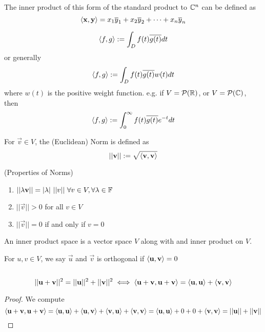 \begin{remark}[Generalization to $\b C^n$]
    The inner product of this form of the standard product to $\b C^n$ can be defined as
    \[ \langle \mathbf x, \mathbf y \rangle = x_1\overline y_1 + x_2\overline y_2 + \cdots + x_n\overline y_n\]
\end{remark}
\begin{remark}
    \[ \langle f, g \rangle : = \int_D f(t)\overline{g(t)} dt\]
    or generally \[ \langle f, g \rangle : = \int_D f(t)\overline{g(t)}w(t) dt\]
    where $w(t)$ is the positive weight function. e.g. if $V = \mathcal P(\mathbb R)$, or $V = \mathcal P(\mathbb C)$, then 
    \[ \langle f, g \rangle : = \int_0^\infty f(t)\overline{g(t)}e^{-t} dt\]
\end{remark}
\begin{definition}
    For $\vec v \in V$, the (Euclidean) Norm is defined as
    \[ ||\mathbf v|| : = \sqrt{\langle \mathbf v,\mathbf v \rangle}\] 
\end{definition}
\begin{theorem}(Properties of Norms)
    \begin{enumerate}
        \item $||\lambda \vec v || = |\lambda| \ ||v|| \ \forall v \in V, \forall \lambda \in \b F $
        \item $||\vec v|| > 0$ for all $v \in V$
        \item $||\vec v|| = 0$ if and only if $v = 0$ 
    \end{enumerate}
\end{theorem}
\begin{definition}
    An inner product space is a vector space $V$ along with and inner product on $V$.
\end{definition}
\begin{definition}
    For $u,v \in V$, we say $\vec u$ and $\vec v$ is orthogonal if $\langle \mathbf u, \mathbf v\rangle = 0$
\end{definition}
\begin{theorem} $ $
\begin{center}
\end{center}
\[ ||\mathbf u + \mathbf v||^2 = ||\mathbf u||^2 + ||\mathbf v||^2 \iff \langle \mathbf u + \mathbf v, \mathbf u + \mathbf v\rangle = \langle \mathbf u, \mathbf u \rangle + \langle \mathbf v, \mathbf v \rangle \]
\end{theorem}
\begin{proof} We compute
    \[ \langle \mathbf u + \mathbf v, \mathbf u + \mathbf v\rangle = \langle \mathbf u,\mathbf u \rangle + \langle \mathbf u , \mathbf v \rangle + \langle \mathbf v, \mathbf u \rangle + \langle \mathbf v,\mathbf v \rangle = \langle \mathbf u,\mathbf u \rangle + 0 + 0 + \langle \mathbf v,\mathbf v \rangle = ||\mathbf u|| + ||\mathbf v|| \]
\end{proof}

